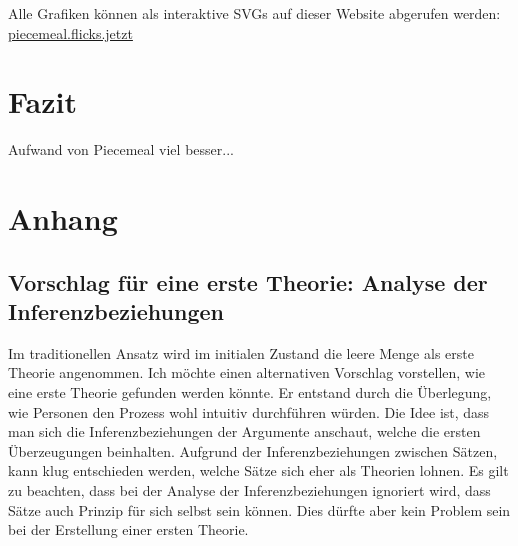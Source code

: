 \documentclass{article}
\begin{document}
Alle Grafiken können als interaktive SVGs auf dieser Website abgerufen werden: \href{https://piecemeal.flicks.jetzt/}{piecemeal.flicks.jetzt}

\section{Fazit}

Aufwand von Piecemeal viel besser... 


\newpage
\printbibliography

\newpage

\section{Anhang}
\subsection{ Vorschlag für eine erste Theorie: Analyse der Inferenzbeziehungen} \label{better-first-theory}
Im traditionellen Ansatz wird im initialen Zustand die leere Menge als erste Theorie angenommen. Ich möchte einen alternativen Vorschlag vorstellen, wie eine erste Theorie gefunden werden könnte. Er entstand durch die Überlegung, wie Personen den Prozess wohl intuitiv durchführen würden. Die Idee ist, dass man sich die Inferenzbeziehungen der Argumente anschaut, welche die ersten Überzeugungen beinhalten. Aufgrund der Inferenzbeziehungen zwischen Sätzen, kann klug entschieden werden, welche Sätze sich eher als Theorien lohnen. Es gilt zu beachten, dass bei der Analyse der Inferenzbeziehungen ignoriert wird, dass Sätze auch Prinzip für sich selbst sein können. Dies dürfte aber kein Problem sein bei der Erstellung einer ersten Theorie.
\end{document}
